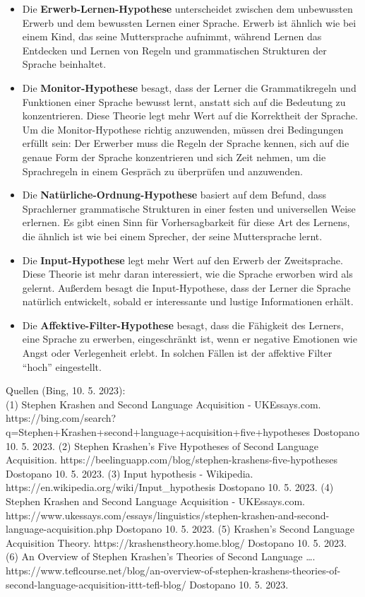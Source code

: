 \documentclass[
  letterpaper,
]{scrbook}
\providecommand{\tightlist}{%
  \setlength{\itemsep}{0pt}\setlength{\parskip}{0pt}}\usepackage{longtable,booktabs,array}
\begin{document}
\begin{itemize}
\tightlist
\item
  Die \textbf{Erwerb-Lernen-Hypothese} unterscheidet zwischen dem
  unbewussten Erwerb und dem bewussten Lernen einer Sprache. Erwerb ist
  ähnlich wie bei einem Kind, das seine Muttersprache aufnimmt, während
  Lernen das Entdecken und Lernen von Regeln und grammatischen
  Strukturen der Sprache beinhaltet.\\
\item
  Die \textbf{Monitor-Hypothese} besagt, dass der Lerner die
  Grammatikregeln und Funktionen einer Sprache bewusst lernt, anstatt
  sich auf die Bedeutung zu konzentrieren. Diese Theorie legt mehr Wert
  auf die Korrektheit der Sprache. Um die Monitor-Hypothese richtig
  anzuwenden, müssen drei Bedingungen erfüllt sein: Der Erwerber muss
  die Regeln der Sprache kennen, sich auf die genaue Form der Sprache
  konzentrieren und sich Zeit nehmen, um die Sprachregeln in einem
  Gespräch zu überprüfen und anzuwenden.\\
\item
  Die \textbf{Natürliche-Ordnung-Hypothese} basiert auf dem Befund, dass
  Sprachlerner grammatische Strukturen in einer festen und universellen
  Weise erlernen. Es gibt einen Sinn für Vorhersagbarkeit für diese Art
  des Lernens, die ähnlich ist wie bei einem Sprecher, der seine
  Muttersprache lernt.\\
\item
  Die \textbf{Input-Hypothese} legt mehr Wert auf den Erwerb der
  Zweitsprache. Diese Theorie ist mehr daran interessiert, wie die
  Sprache erworben wird als gelernt. Außerdem besagt die
  Input-Hypothese, dass der Lerner die Sprache natürlich entwickelt,
  sobald er interessante und lustige Informationen erhält.\\
\item
  Die \textbf{Affektive-Filter-Hypothese} besagt, dass die Fähigkeit des
  Lerners, eine Sprache zu erwerben, eingeschränkt ist, wenn er negative
  Emotionen wie Angst oder Verlegenheit erlebt. In solchen Fällen ist
  der affektive Filter ``hoch'' eingestellt.
\end{itemize}

Quellen (Bing, 10. 5. 2023):\\
(1) Stephen Krashen and Second Language Acquisition - UKEssays.com.
https://bing.com/search?q=Stephen+Krashen+second+language+acquisition+five+hypotheses
Dostopano 10. 5. 2023. (2) Stephen Krashen's Five Hypotheses of Second
Language Acquisition.
https://beelinguapp.com/blog/stephen-krashens-five-hypotheses Dostopano
10. 5. 2023. (3) Input hypothesis - Wikipedia.
https://en.wikipedia.org/wiki/Input\_hypothesis Dostopano 10. 5. 2023.
(4) Stephen Krashen and Second Language Acquisition - UKEssays.com.
https://www.ukessays.com/essays/linguistics/stephen-krashen-and-second-language-acquisition.php
Dostopano 10. 5. 2023. (5) Krashen's Second Language Acquisition Theory.
https://krashenstheory.home.blog/ Dostopano 10. 5. 2023. (6) An Overview
of Stephen Krashen's Theories of Second Language \ldots.
https://www.teflcourse.net/blog/an-overview-of-stephen-krashens-theories-of-second-language-acquisition-ittt-tefl-blog/
Dostopano 10. 5. 2023.
\end{document}

